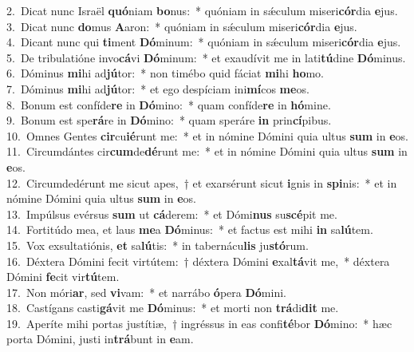 {2.~}Dicat nunc Israël \textbf{quó}niam \textbf{bo}nus:~* quóniam in sǽculum miseri\textbf{cór}dia \textbf{e}jus.\\
{3.~}Dicat nunc \textbf{do}mus \textbf{A}aron:~* quóniam in sǽculum miseri\textbf{cór}dia \textbf{e}jus.\\
{4.~}Dicant nunc qui \textbf{ti}ment \textbf{Dó}minum:~* quóniam in sǽculum miseri\textbf{cór}dia \textbf{e}jus.\\
{5.~}De tribulatióne invo\textbf{cá}vi \textbf{Dó}minum:~* et exaudívit me in lati\textbf{tú}dine \textbf{Dó}minus.\\
{6.~}Dóminus \textbf{mi}hi ad\textbf{jú}tor:~* non timébo quid fáciat \textbf{mi}hi \textbf{ho}mo.\\
{7.~}Dóminus \textbf{mi}hi ad\textbf{jú}tor:~* et ego despíciam ini\textbf{mí}cos \textbf{me}os.\\
{8.~}Bonum est confíde\textbf{re} in \textbf{Dó}mino:~* quam confíde\textbf{re} in \textbf{hó}mine.\\
{9.~}Bonum est spe\textbf{rá}re in \textbf{Dó}mino:~* quam speráre \textbf{in} prin\textbf{cí}pibus.\\
{10.~}Omnes Gentes \textbf{cir}cu\textbf{ié}runt me:~* et in nómine Dómini quia ultus \textbf{sum} in \textbf{e}os.\\
{11.~}Circumdántes cir\textbf{cum}de\textbf{dé}runt me:~* et in nómine Dómini quia ultus \textbf{sum} in \textbf{e}os.\\
{12.~}Circumdedérunt me sicut apes,~† et exarsérunt sicut \textbf{i}gnis in \textbf{spi}nis:~* et in nómine Dómini quia ultus \textbf{sum} in \textbf{e}os.\\
{13.~}Impúlsus evérsus \textbf{sum} ut \textbf{cá}derem:~* et Dómi\textbf{nus} su\textbf{scé}pit me.\\
{14.~}Fortitúdo mea, et laus \textbf{me}a \textbf{Dó}minus:~* et factus est mihi \textbf{in} sa\textbf{lú}tem.\\
{15.~}Vox exsultatiónis, \textbf{et} sa\textbf{lú}tis:~* in tabernácu\textbf{lis} ju\textbf{stó}rum.\\
{16.~}Déxtera Dómini fecit virtútem:~† déxtera Dómini \textbf{e}xal\textbf{tá}vit me,~* déxtera Dómini \textbf{fe}cit vir\textbf{tú}tem.\\
{17.~}Non móri\textbf{ar}, sed \textbf{vi}vam:~* et narrábo \textbf{ó}pera \textbf{Dó}mini.\\
{18.~}Castígans casti\textbf{gá}vit me \textbf{Dó}minus:~* et morti non \textbf{trá}di\textbf{dit} me.\\
{19.~}Aperíte mihi portas justítiæ,~† ingréssus in eas confi\textbf{té}bor \textbf{Dó}mino:~* hæc porta Dómini, justi in\textbf{trá}bunt in \textbf{e}am.\\
